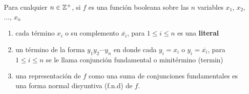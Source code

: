 \begin{definicion}{}{}
    Para cualquier $n \in \ZZ[+]$, si $f$ es una función booleana sobre las $n$ variables $x_1$, $x_2$, $\dots$, $x_n$
    \begin{enumerate}[label=\alph*)]
        \item cada término $x_i$ o su complemento $\overline{x_i}$, para $1 \leq i \leq n$ es una \textbf{literal}
        \item un término de la forma $y_1 y_2 \cdots y_n$ en donde cada $y_i = x_i$ o $y_i = \overline{x_i}$, para $1 \leq i \leq n$ se le llama conjunción fundamental o minitérmino (termin)
        \item una representación de $f$ como una suma de conjunciones fundamentales es una forma normal disyuntiva (f.n.d) de $f$.
    \end{enumerate}
\end{definicion}

\newpage

